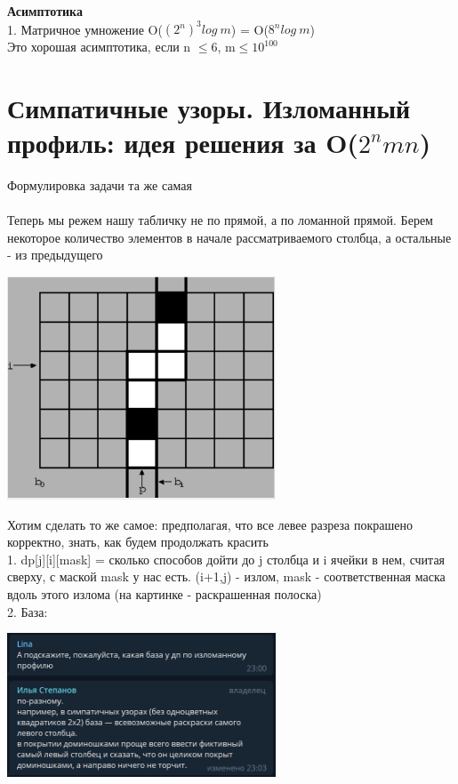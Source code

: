  \textbf{Асимптотика}\\
 1. Матричное умножение O($(2^n)^3log\ m$) =  O($8^nlog \ m$)
 \\
Это хорошая асимптотика, если n $\leq 6$, m$\leq 10^{100}$

\setcounter{section}{23}
\section{Симпатичные узоры. Изломанный профиль: идея решения за O($2^n mn$)}
Формулировка задачи та же самая
\\
\\
Теперь мы режем нашу табличку не по прямой, а по ломанной прямой. Берем некоторое количество элементов в начале рассматриваемого столбца, а остальные - из предыдущего
\begin{center}
    \includegraphics[width=8cm]{images/18-24_alg5.PNG}
\end{center}
Хотим сделать то же самое: предполагая, что все левее разреза покрашено корректно, знать, как будем продолжать красить\\
1. dp[j][i][mask] =  сколько способов дойти до j столбца и  i ячейки в нем, считая сверху, с маской mask у нас есть. (i+1,j) -  излом,  mask - соответственная маска вдоль этого излома (на картинке - раскрашенная полоска)\\
2. База: 
\begin{center}
    \includegraphics[width=8cm]{images/18-24_alg27.PNG}
\end{center}
